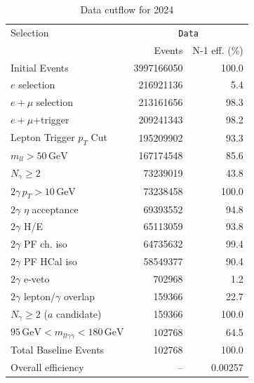 \begin{table}[htbp]
\centering
\caption{Data cutflow for 2024}
\label{tab:cutflow-data-2024}
\footnotesize
\begin{tabular}{lrr}
\hline
Selection & \multicolumn{2}{c}{\texttt{Data}} \\
 & Events & N-1 eff. (\%) \\
\hline
Initial Events & 3997166050 & 100.0 \\
$e$ selection & 216921136 & 5.4 \\
$e+\mu$ selection & 213161656 & 98.3 \\
$e+\mu$+trigger & 209241343 & 98.2 \\
Lepton Trigger $p_T$ Cut & 195209902 & 93.3 \\
$m_{ll} > 50\,\mathrm{GeV}$ & 167174548 & 85.6 \\
$N_{\gamma}\geq 2$ & 73239019 & 43.8 \\
$2\gamma\,p_T > 10\,\mathrm{GeV}$ & 73238458 & 100.0 \\
$2\gamma$ $\eta$ acceptance & 69393552 & 94.8 \\
$2\gamma$ H/E & 65113059 & 93.8 \\
$2\gamma$ PF ch. iso & 64735632 & 99.4 \\
$2\gamma$ PF HCal iso & 58549377 & 90.4 \\
$2\gamma$ e-veto & 702968 & 1.2 \\
$2\gamma$ lepton/$\gamma$ overlap & 159366 & 22.7 \\
$N_{\gamma}\geq 2$ ($a$ candidate) & 159366 & 100.0 \\
$95\,\mathrm{GeV} < m_{ll\gamma\gamma} < 180\,\mathrm{GeV}$ & 102768 & 64.5 \\
Total Baseline Events & 102768 & 100.0 \\
\hline
Overall efficiency & -- & 0.00257 \\
\hline
\end{tabular}
\end{table}

